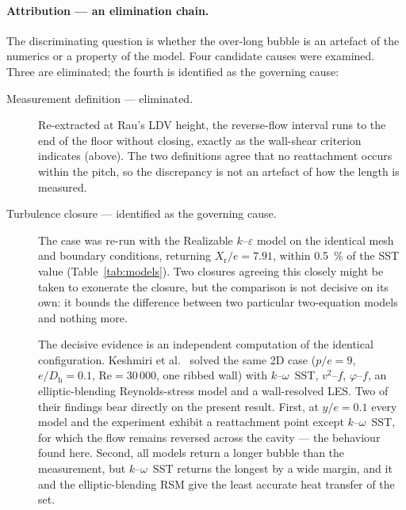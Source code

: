 \documentclass[11pt,a4paper]{article}
\newcommand{\Dh}{D_{\mathrm{h}}}
\newcommand{\Rey}{\mathrm{Re}}
\newcommand{\Xr}{X_{\mathrm{r}}}
\begin{document}
\paragraph{Attribution --- an elimination chain.}
The discriminating question is whether the over-long bubble is an artefact
of the numerics or a property of the model. Four candidate causes were
examined. Three are eliminated; the fourth is identified as the governing
cause:

\begin{description}
  \item[Measurement definition --- eliminated.] Re-extracted at Rau's LDV
  height, the reverse-flow interval runs to the end of the floor without
  closing, exactly as the wall-shear criterion indicates (above). The two
  definitions agree that no reattachment occurs within the pitch, so the
  discrepancy is not an artefact of how the length is measured.

  \item[Turbulence closure --- identified as the governing cause.] The case
  was re-run with the Realizable $k$--$\varepsilon$ model on the identical
  mesh and boundary conditions, returning $\Xr/e = 7.91$, within
  \SI{0.5}{\percent} of the SST value (Table~\ref{tab:models}). Two closures
  agreeing this closely might be taken to exonerate the closure, but the
  comparison is not decisive on its own: it bounds the difference between
  two particular two-equation models and nothing more.

  The decisive evidence is an independent computation of the identical
  configuration. Keshmiri et al.~\cite{keshmiri2016} solved the same 2D case
  ($p/e = 9$, $e/\Dh = 0.1$, $\Rey = 30\,000$, one ribbed wall) with
  $k$--$\omega$~SST, $v^{2}$--$f$, $\varphi$--$f$, an elliptic-blending
  Reynolds-stress model and a wall-resolved LES. Two of their findings bear
  directly on the present result. First, at $y/e = 0.1$ every model and the
  experiment exhibit a reattachment point except $k$--$\omega$~SST, for
  which the flow remains reversed across the cavity --- the behaviour found
  here. Second, all models return a longer bubble than the measurement, but
  $k$--$\omega$~SST returns the longest by a wide margin, and it and the
  elliptic-blending RSM give the least accurate heat transfer of the set.


\end{description}
\end{document}
